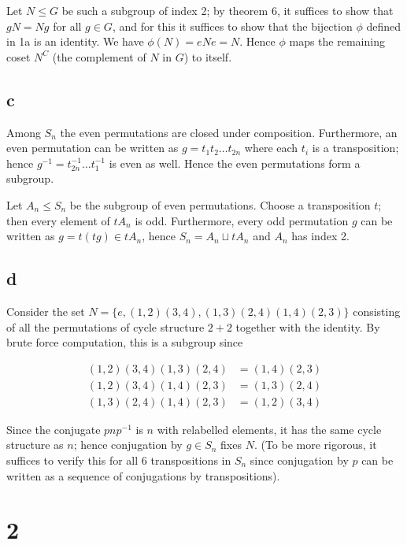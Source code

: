 \documentclass{article}
\def\inv{{-1}}
\begin{document}
Let $N \le G$ be such a subgroup of index 2; by theorem 6, it suffices to show that $gN = Ng$ for all $g \in G$, and for this it suffices to show that the bijection $\phi$ defined in 1a is an identity. We have $\phi(N) = eNe = N$. Hence $\phi$ maps the remaining coset $N^C$ (the complement of $N$ in $G$) to itself.

\subsection*{c}

Among $S_n$ the even permutations are closed under composition. Furthermore, an even permutation can be written as $g = t_1 t_2 \ldots t_{2n}$ where each $t_i$ is a transposition; hence $g^\inv = t_{2n}^\inv \ldots t_1^\inv$ is even as well. Hence the even permutations form a subgroup. 

Let $A_n \le S_n$ be the subgroup of even permutations. Choose a transposition $t$; then every element of $tA_n$ is odd. Furthermore, every odd permutation $g$ can be written as $g = t (t g) \in tA_n$, hence $S_n = A_n \sqcup tA_n$ and $A_n$ has index 2.

\subsection*{d}

Consider the set $N = \{e, (1, 2)(3, 4), (1, 3)(2, 4) (1, 4)(2, 3)\}$ consisting of all the permutations of cycle structure $2+2$ together with the identity. By brute force computation, this is a subgroup since

\begin{align*}
(1, 2)(3, 4)(1, 3)(2, 4) &= (1,4)(2,3) \\
(1, 2)(3, 4)(1, 4)(2, 3) &= (1,3)(2,4) \\
(1, 3)(2, 4)(1, 4)(2, 3) &= (1,2)(3,4)
\end{align*}

Since the conjugate $pnp^\inv$ is $n$ with relabelled elements, it has the same cycle structure as $n$; hence conjugation by $g \in S_n$ fixes $N$. (To be more rigorous, it suffices to verify this for all 6 transpositions in $S_n$ since conjugation by $p$ can be written as a sequence of conjugations by transpositions).

\section*{2}

\end{document}
